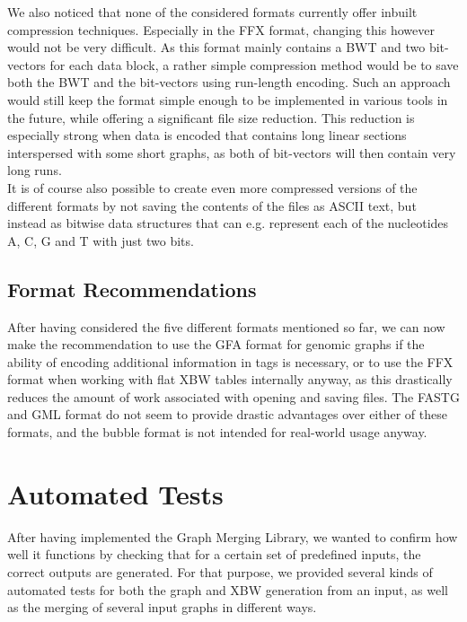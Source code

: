 \documentclass[a4paper,12pt,twoside,BCOR=10mm]{scrbook}
\begin{document}
We also noticed that none of the considered formats currently offer inbuilt compression techniques.
Especially in the FFX format, changing this however would not be very difficult.
As this format mainly contains a BWT and two bit-vectors for each data block,
a rather simple compression method would be to save both the BWT and the bit-vectors
using run-length encoding.
Such an approach would still keep the format simple enough to be implemented in various
tools in the future, while offering a significant file size reduction.
This reduction is especially strong when data is encoded that contains long linear sections
interspersed with some short graphs, as both of bit-vectors will then
contain very long runs. \\
It is of course also possible to create even more compressed versions
of the different formats by not saving the contents of the files as ASCII text,
but instead as bitwise data structures that can e.g. represent each of the nucleotides A, C, G and T with
just two bits.

\subsection{Format Recommendations}

After having considered the five different formats mentioned so far,
we can now make the recommendation to use the GFA format for genomic graphs
if the ability of encoding additional information in tags is necessary,
or to use the FFX format when working with flat XBW tables internally anyway,
as this drastically reduces the amount of work associated with opening and saving files.
The FASTG and GML format do not seem to provide drastic advantages over either of these formats,
and the bubble format is not intended for real-world usage anyway.

\section{Automated Tests}
%

After having implemented the Graph Merging Library,
we wanted to confirm how well it functions by checking
that for a certain set of predefined inputs, the correct outputs are generated.
For that purpose, we provided several kinds of automated tests for both the
graph and XBW generation from an input, as well as the merging of several input graphs
in different ways.
\end{document}
